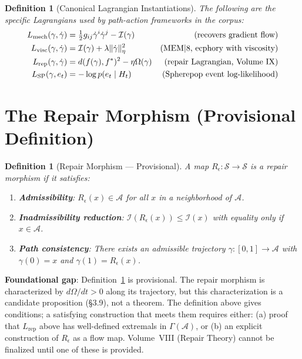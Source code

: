 \documentclass[11pt, a4paper]{book}
\theoremstyle{flyxion}
\newtheorem{definition}[theorem]{Definition}
\theoremstyle{remark}
\begin{document}
\begin{definition}[Canonical Lagrangian Instantiations]
The following are the specific Lagrangians used by path-action
frameworks in the corpus:
\begin{align*}
L_\mathrm{mech}(\gamma,\dot\gamma) &=
  \tfrac{1}{2}g_{ij}\dot\gamma^i\dot\gamma^j - \mathcal{I}(\gamma)
  &\text{(recovers gradient flow)}\\
L_\mathrm{visc}(\gamma,\dot\gamma) &=
  \mathcal{I}(\gamma) + \lambda\|\dot\gamma\|^2_\eta
  &\text{(MEM\textbar{}8, ecphory with viscosity)}\\
L_\mathrm{rep}(\gamma,\dot\gamma) &=
  d(f(\gamma), f^*)^2 - \eta\Omega(\gamma)
  &\text{(repair Lagrangian, Volume IX)}\\
L_\mathrm{SP}(\gamma, e_t) &=
  -\log p(e_t \mid H_t)
  &\text{(Spherepop event log-likelihood)}
\end{align*}
\end{definition}

\section{The Repair Morphism (Provisional Definition)}

\begin{definition}[Repair Morphism --- Provisional]
\label{def:repair}
A map $R_\epsilon: \mathcal{S} \to \mathcal{S}$ is a
\emph{repair morphism} if it satisfies:
\begin{enumerate}
\item \textbf{Admissibility}: $R_\epsilon(x) \in \mathcal{A}$ for
  all $x$ in a neighborhood of $\mathcal{A}$.
\item \textbf{Inadmissibility reduction}:
  $\mathcal{I}(R_\epsilon(x)) \leq \mathcal{I}(x)$ with equality
  only if $x \in \mathcal{A}$.
\item \textbf{Path consistency}: There exists an admissible
  trajectory $\gamma: [0,1] \to \mathcal{A}$ with $\gamma(0) = x$
  and $\gamma(1) = R_\epsilon(x)$.
\end{enumerate}
\end{definition}

\begin{warningbox}
\textbf{Foundational gap}: Definition~\ref{def:repair} is provisional.
The repair morphism is characterized by $d\Omega/dt > 0$ along its
trajectory, but this characterization is a candidate proposition
(§3.9), not a theorem. The definition above gives conditions; a
satisfying construction that meets them requires either: (a) proof
that $L_\mathrm{rep}$ above has well-defined extremals in
$\Gamma(\mathcal{A})$, or (b) an explicit construction of
$R_\epsilon$ as a flow map. Volume~VIII (Repair Theory) cannot be
finalized until one of these is provided.
\end{warningbox}
\end{document}
